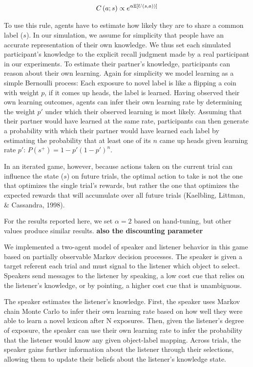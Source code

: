 \documentclass[10pt, letterpaper]{article}
\begin{document}
\[ 
C\left(a;s\right) \propto e^{\alpha \mathbb{E}\left[ U \left(s,a\right)) \right]}
\]

To use this rule, agents have to estimate how likely they are to share a
common label (\(s\)). In our simulation, we assume for simplicity that
people have an accurate representation of their own knowledge. We thus
set each simulated participant's knowledge to the explicit recall
judgment made by a real participant in our experiments. To estimate
their partner's knowledge, participants can reason about their own
learning. Again for simplicity we model learning as a simple Bernoulli
process: Each exposure to novel label is like a flipping a coin with
weight \(p\), if it comes up heads, the label is learned. Having
observed their own learning outcomes, agents can infer their own
learning rate by determining the weight \(p'\) under which their
observed learning is most likely. Assuming that their partner would have
learned at the same rate, participants can then generate a probability
with which their partner would have learned each label by estimating the
probability that at least one of its \(n\) came up heads given learning
rate \(p'\): \(P\left(s^{+}\right)=1-p'\left( 1-p' \right)^{n}\).

In an iterated game, however, because actions taken on the current trial
can influence the state (\(s\)) on future trials, the optimal action to
take is not the one that optimizes the single trial's rewards, but
rather the one that optimizes the expected rewards that will accumulate
over all future trials (Kaelbling, Littman, \& Cassandra, 1998).

For the results reported here, we set \(\alpha = 2\) based on
hand-tuning, but other values produce similar results. \textbf{also the
discounting parameter}

We implemented a two-agent model of speaker and listener behavior in
this game based on partially observable Markov decision processes. The
speaker is given a target referent each trial and must signal to the
listener which object to select. Speakers send messages to the listener
by speaking, a low cost cue that relies on the listener's knowledge, or
by pointing, a higher cost cue that is unambiguous.

The speaker estimates the listener's knowledge. First, the speaker uses
Markov chain Monte Carlo to infer their own learning rate based on how
well they were able to learn a novel lexicon after N exposures. Then,
given the listener's degree of exposure, the speaker can use their own
learning rate to infer the probability that the listener would know any
given object-label mapping. Across trials, the speaker gains further
information about the listener through their selections, allowing them
to update their beliefs about the listener's knowledge state.
\end{document}
